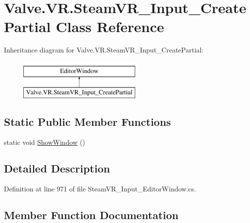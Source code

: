 \hypertarget{class_valve_1_1_v_r_1_1_steam_v_r___input___create_partial}{}\section{Valve.\+V\+R.\+Steam\+V\+R\+\_\+\+Input\+\_\+\+Create\+Partial Class Reference}
\label{class_valve_1_1_v_r_1_1_steam_v_r___input___create_partial}
Inheritance diagram for Valve.\+V\+R.\+Steam\+V\+R\+\_\+\+Input\+\_\+\+Create\+Partial\+:\begin{figure}[H]
\begin{center}
\leavevmode
\includegraphics[height=2.000000cm]{class_valve_1_1_v_r_1_1_steam_v_r___input___create_partial}
\end{center}
\end{figure}
\subsection*{Static Public Member Functions}
\begin{DoxyCompactItemize}
\item 
static void \mbox{\hyperlink{class_valve_1_1_v_r_1_1_steam_v_r___input___create_partial_a95d11c4dfb940099132d91da8d9b48f9}{Show\+Window}} ()
\end{DoxyCompactItemize}


\subsection{Detailed Description}


Definition at line 971 of file Steam\+V\+R\+\_\+\+Input\+\_\+\+Editor\+Window.\+cs.



\subsection{Member Function Documentation}
\mbox{\label{class_valve_1_1_v_r_1_1_steam_v_r___input___create_partial_a95d11c4dfb940099132d91da8d9b48f9}} 
